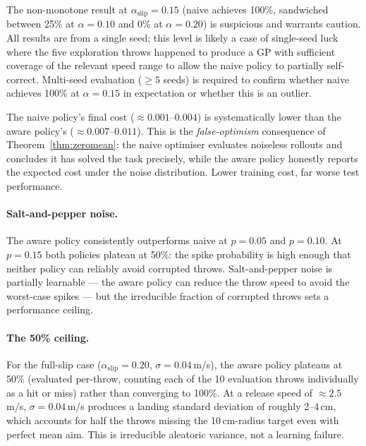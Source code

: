 The non-monotone result at $\alpha_{\mathrm{slip}} = 0.15$ (naive achieves 100\%,
sandwiched between 25\% at $\alpha = 0.10$ and 0\% at $\alpha = 0.20$) is suspicious
and warrants caution.
All results are from a single seed; this level is likely a case of single-seed luck
where the five exploration throws happened to produce a GP with sufficient coverage
of the relevant speed range to allow the naive policy to partially self-correct.
Multi-seed evaluation ($\geq 5$ seeds) is required to confirm whether naive
achieves 100\% at $\alpha = 0.15$ in expectation or whether this is an outlier.

The naive policy's final cost ($\approx 0.001$--$0.004$) is systematically lower
than the aware policy's ($\approx 0.007$--$0.011$).
This is the \emph{false-optimism} consequence of Theorem~\ref{thm:zeromean}: the naive
optimiser evaluates noiseless rollouts and concludes it has solved the task precisely,
while the aware policy honestly reports the expected cost under the noise distribution.
Lower training cost, far worse test performance.

\paragraph{Salt-and-pepper noise.}
The aware policy consistently outperforms naive at $p = 0.05$ and $p = 0.10$.
At $p = 0.15$ both policies plateau at 50\%: the spike probability is high enough that
neither policy can reliably avoid corrupted throws.
Salt-and-pepper noise is partially learnable — the aware policy can reduce the throw
speed to avoid the worst-case spikes — but the irreducible fraction of corrupted throws
sets a performance ceiling.

\paragraph{The 50\% ceiling.}
For the full-slip case ($\alpha_{\mathrm{slip}} = 0.20$, $\sigma = 0.04$\,m/s), the
aware policy plateaus at 50\% (evaluated per-throw, counting each of the 10 evaluation
throws individually as a hit or miss) rather than converging to 100\%.
At a release speed of $\approx 2.5$\,m/s, $\sigma = 0.04$\,m/s produces a landing
standard deviation of roughly 2--4\,cm, which accounts for half the throws missing
the 10\,cm-radius target even with perfect mean aim.
This is irreducible aleatoric variance, not a learning failure.
